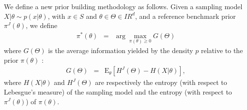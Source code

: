 \documentclass[10pt]{article}
\newcommand{\R}{I\!\!R}
\newcommand{\E}{\mbox{E}}
\newcommand{\1}{\mathbbm{1}}
\begin{document}
We define a new prior building methodology as follows. Given a sampling model $X|\theta \sim p(x|\theta)$, with $x\in S$ and $\theta\in\Theta\in\R^d$, and a reference benchmark prior $\pi^J(\theta)$, we define
\begin{eqnarray}
\pi^*(\theta) & = & \arg\max\limits_{\pi(\theta)\geq 0} G(\Theta) \label{mdiprior}
\end{eqnarray}
where $G(\Theta)$ is the average information yielded by the  density $p$ relative to the prior $\pi(\theta)$ :
\begin{eqnarray*}
G(\Theta) & = & \E_{\theta}\left[H^J(\Theta) - H(X|\theta)\right],
\end{eqnarray*}
where $H(X|\theta)$ and
$H^J(\Theta)$ are respectively the entropy (with respect to Lebesgue's measure) of the sampling model and the entropy (with respect to $\pi^J(\theta)$) of $\pi(\theta)$. 
\end{document}

